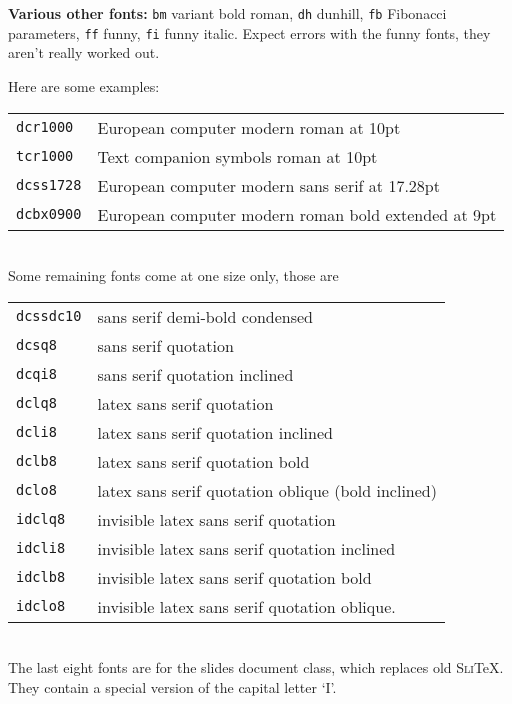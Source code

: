 \documentclass{article}
\renewcommand{\-}{\discretionary{\char'0177 }{}{}}
\begin{document}
\textbf{Various other fonts:} \texttt{bm} variant bold roman,
\texttt{dh} dunhill, \texttt{fb} Fibonacci parameters, \texttt{ff} funny,
\texttt{fi} funny italic. Expect errors with the funny fonts, they aren't 
really worked out.


Here are some examples:\\
\begin{tabular}{ll}
\texttt{dcr1000}  & European computer modern roman at 10pt\\
\texttt{tcr1000}  & Text companion symbols roman at 10pt\\
\texttt{dcss1728} & European computer modern sans serif at 17.28pt\\
\texttt{dcbx0900} & European computer modern roman bold extended at 9pt
\end{tabular}\\[18pt]
Some remaining fonts come at one size only, those are\\
\begin{tabular}{ll}
\texttt{dcssdc10} & sans serif demi-bold condensed\\
\texttt{dcsq8}    & sans serif quotation\\
\texttt{dcqi8}    & sans serif quotation inclined\\
\texttt{dclq8}    & latex sans serif quotation \\
\texttt{dcli8}    & latex sans serif quotation inclined\\
\texttt{dclb8}    & latex sans serif quotation bold\\
\texttt{dclo8}    & latex sans serif quotation oblique (bold inclined)\\
\texttt{idclq8}   & invisible latex sans serif quotation \\
\texttt{idcli8}   & invisible latex sans serif quotation inclined\\
\texttt{idclb8}   & invisible latex sans serif quotation bold\\
\texttt{idclo8}   & invisible latex sans serif quotation oblique.
\end{tabular}\\
The last eight fonts are for the \textsf{slides} document class, which 
replaces old \textsc{Sli}\TeX. They contain a special version of the capital
letter `I'.

\appendix
\end{document}
